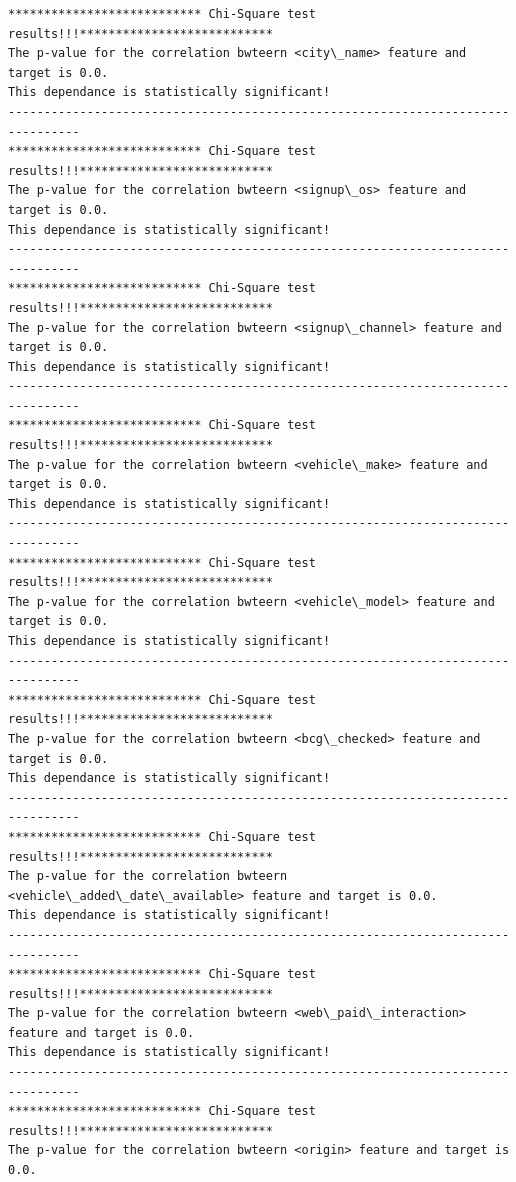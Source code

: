 \documentclass[11pt]{article}
\begin{document}
    \begin{Verbatim}[commandchars=\\\{\}]
*************************** Chi-Square test results!!!***************************
The p-value for the correlation bwteern <city\_name> feature and target is 0.0.
This dependance is statistically significant!
--------------------------------------------------------------------------------
*************************** Chi-Square test results!!!***************************
The p-value for the correlation bwteern <signup\_os> feature and target is 0.0.
This dependance is statistically significant!
--------------------------------------------------------------------------------
*************************** Chi-Square test results!!!***************************
The p-value for the correlation bwteern <signup\_channel> feature and target is 0.0.
This dependance is statistically significant!
--------------------------------------------------------------------------------
*************************** Chi-Square test results!!!***************************
The p-value for the correlation bwteern <vehicle\_make> feature and target is 0.0.
This dependance is statistically significant!
--------------------------------------------------------------------------------
*************************** Chi-Square test results!!!***************************
The p-value for the correlation bwteern <vehicle\_model> feature and target is 0.0.
This dependance is statistically significant!
--------------------------------------------------------------------------------
*************************** Chi-Square test results!!!***************************
The p-value for the correlation bwteern <bcg\_checked> feature and target is 0.0.
This dependance is statistically significant!
--------------------------------------------------------------------------------
*************************** Chi-Square test results!!!***************************
The p-value for the correlation bwteern <vehicle\_added\_date\_available> feature and target is 0.0.
This dependance is statistically significant!
--------------------------------------------------------------------------------
*************************** Chi-Square test results!!!***************************
The p-value for the correlation bwteern <web\_paid\_interaction> feature and target is 0.0.
This dependance is statistically significant!
--------------------------------------------------------------------------------
*************************** Chi-Square test results!!!***************************
The p-value for the correlation bwteern <origin> feature and target is 0.0.

\end{Verbatim}
\end{document}
